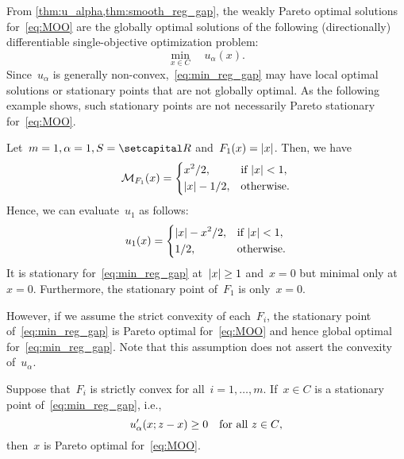 \documentclass[../../main]{subfiles}
\begin{document}
From \cref{thm:u_alpha,thm:smooth_reg_gap}, the weakly Pareto optimal solutions for~\cref{eq:MOO} are the globally optimal solutions of the following (directionally) differentiable single-objective optimization problem:
\begin{equation} \label{eq:min_reg_gap}
    \min_{x \in C} \quad u_\alpha(x)
.\end{equation} 
Since~$u_\alpha$ is generally non-convex,~\cref{eq:min_reg_gap} may have local optimal solutions or stationary points that are not globally optimal.
As the following example shows, such stationary points are not necessarily Pareto stationary for~\cref{eq:MOO}.
\begin{example} \label{ex:min_reg_gap}
    Let~$m = 1, \alpha = 1, S = \setR$ and~$F_1(x) = \lvert x\rvert$.
    Then, we have
    \[
        \operatorname{\mathcal{M}}_{F_1}(x) = \begin{dcases}
            x^2 / 2, & \text{if } \lvert x\rvert < 1, \\
            \lvert x\rvert - 1 / 2, & \text{otherwise}
        .\end{dcases}
    \]
    Hence, we can evaluate~$u_1$ as follows:
    \[
        u_1(x) = \begin{dcases}
            \lvert x\rvert - x^2 / 2, & \text{if } \lvert x\rvert < 1, \\
            1 / 2, & \text{otherwise}
        .\end{dcases}
    \] 
    It is stationary for~\cref{eq:min_reg_gap} at~$\lvert x\rvert \ge 1$ and~$x = 0$ but minimal only at~$x = 0$.
    Furthermore, the stationary point of~$F_1$ is only~$x = 0$.
\end{example}
However, if we assume the strict convexity of each~$F_i$, the stationary point of~\cref{eq:min_reg_gap} is Pareto optimal for~\cref{eq:MOO} and hence global optimal for~\cref{eq:min_reg_gap}.
Note that this assumption does not assert the convexity of~$u_\alpha$.
\begin{theorem} \label{thm:stationary_reg_gap}
    Suppose that~$F_i$ is strictly convex for all~$i = 1, \dots, m$.
    If~$x \in C$ is a stationary point of~\cref{eq:min_reg_gap}, i.e.,
    \[
        u_\alpha'(x; z - x) \ge 0 \quad \text{for all~$z \in C$}
    ,\]
    then~$x$ is Pareto optimal for~\cref{eq:MOO}.
\end{theorem}
\end{document}

